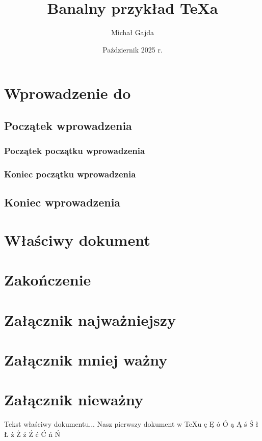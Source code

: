 \documentclass[12pt,a4paper]{article}
\title{Banalny przykład \TeX{a}}
\author{Michał Gajda}
\date{Październik 2025 r.}
\begin{document}
\maketitle
\newpage
\tableofcontents
\newpage
\section{Wprowadzenie do}
\subsection {Początek wprowadzenia}
\subsubsection {Początek początku wprowadzenia}
\subsubsection {Koniec początku wprowadzenia}
\subsection {Koniec wprowadzenia}
\section{Właściwy dokument}
\section{Zakończenie}
\appendix
\section {Załącznik najważniejszy}
\section {Załącznik mniej ważny}
\section {Załącznik nieważny}
\newpage
Tekst właściwy dokumentu...
Nasz pierwszy dokument w \TeX{u}
ę Ę ó Ó ą Ą ś Ś ł Ł ż Ż ź Ź ć Ć ń Ń
\end{document}
